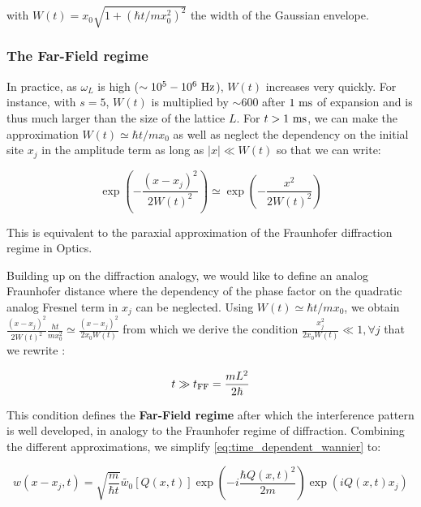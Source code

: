 \noindent with $W(t)=x_{0} \sqrt{1+\left(\hbar t / m x_{0}^{2}\right)^{2}}$ the width of the Gaussian envelope.

\subsubsection{The Far-Field regime}

In practice, as $\omega_L$ is high ($\sim 10^5-10^6 \ \rm{Hz}$), $W(t)$ increases very quickly. For instance, with $s=5$, $W(t)$ is multiplied by $\sim 600$ after $1 \ \rm{ms}$ of expansion and is thus much larger than the size of the lattice $L$. For $t>1 \ \rm{ms}$, we can make the approximation $W(t) \simeq \hbar t/m x_0$ as well as neglect the dependency on the initial site $x_j$ in the amplitude term as long as $|x| \ll W(t)$ so that we can write:

\begin{equation}
    \exp \left(-\frac{\left(x-x_{j}\right)^{2}}{2 W(t)^{2}}\right) \simeq \exp \left(-\frac{x^{2}}{2 W(t)^{2}}\right)
\end{equation}

\noindent This is equivalent to the paraxial approximation of the Fraunhofer diffraction regime in Optics.

Building up on the diffraction analogy, we would like to define an analog Fraunhofer distance where the dependency of the phase factor on the quadratic analog Fresnel term in $x_j$ can be neglected. Using $W(t) \simeq \hbar t/m x_0$, we obtain $\frac{\left(x-x_{j}\right)^{2}}{2 W(t)^{2}} \frac{h t}{m x_{0}^{2}} \simeq \frac{\left(x-x_{j}\right)^{2}}{2 x_0 W(t)}$ from which we derive the condition $\frac{x_j^2}{2 x_0 W(t)} \ll 1, \forall j$ that we rewrite \cite{gerbier2008expansion,toth2008theory}:

\begin{equation}
    t \gg t_{\rm{FF}} = \frac{mL^2}{2 \hbar}
    \label{eq:far_field}
\end{equation}

\noindent This condition defines the \textbf{Far-Field regime} after which the interference pattern is well developed, in analogy to the Fraunhofer regime of diffraction. Combining the different approximations, we simplify \ref{eq:time_dependent_wannier} to:

\begin{equation}
    w\left(x-x_{j}, t\right)=\sqrt{\frac{m}{\hbar t}} \tilde{w_0}[Q(x,t)] \exp\left(-i \frac{\hbar Q(x,t)^{2}}{2 m} \right) \exp\left(i Q(x,t) x_{j}\right)
\end{equation}

